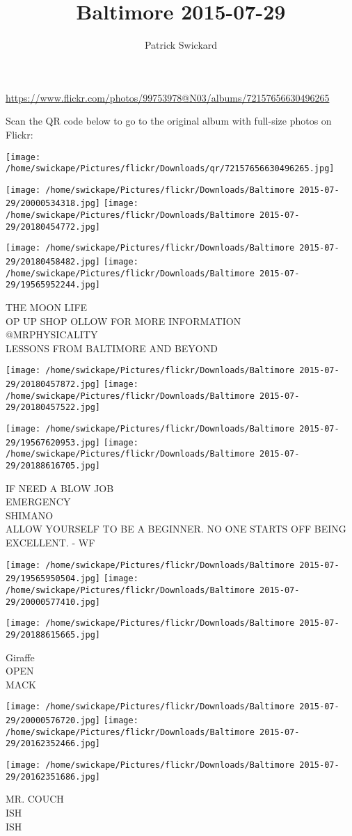 \documentclass[10pt,letterpaper]{article}
\title{Baltimore 2015-07-29}
\author{Patrick Swickard}
\date{}
\begin{document}
\maketitle

\url{https://www.flickr.com/photos/99753978@N03/albums/72157656630496265}

Scan the QR code below to go to the original album with full-size photos on Flickr:

\texttt{[image: /home/swickape/Pictures/flickr/Downloads/qr/72157656630496265.jpg]}
\pagebreak

\texttt{[image: /home/swickape/Pictures/flickr/Downloads/Baltimore 2015-07-29/20000534318.jpg]}
\texttt{[image: /home/swickape/Pictures/flickr/Downloads/Baltimore 2015-07-29/20180454772.jpg]}

\texttt{[image: /home/swickape/Pictures/flickr/Downloads/Baltimore 2015-07-29/20180458482.jpg]}
\texttt{[image: /home/swickape/Pictures/flickr/Downloads/Baltimore 2015-07-29/19565952244.jpg]}

THE MOON LIFE\\
OP UP SHOP OLLOW FOR MORE INFORMATION\\
@MRPHYSICALITY\\
LESSONS FROM BALTIMORE AND BEYOND
\pagebreak

\texttt{[image: /home/swickape/Pictures/flickr/Downloads/Baltimore 2015-07-29/20180457872.jpg]}
\texttt{[image: /home/swickape/Pictures/flickr/Downloads/Baltimore 2015-07-29/20180457522.jpg]}

\texttt{[image: /home/swickape/Pictures/flickr/Downloads/Baltimore 2015-07-29/19567620953.jpg]}
\texttt{[image: /home/swickape/Pictures/flickr/Downloads/Baltimore 2015-07-29/20188616705.jpg]}

IF NEED A BLOW JOB\\
EMERGENCY\\
SHIMANO\\
ALLOW YOURSELF TO BE A BEGINNER.  NO ONE STARTS OFF BEING EXCELLENT.  {-} WF
\pagebreak

\texttt{[image: /home/swickape/Pictures/flickr/Downloads/Baltimore 2015-07-29/19565950504.jpg]}
\texttt{[image: /home/swickape/Pictures/flickr/Downloads/Baltimore 2015-07-29/20000577410.jpg]}

\vspace{0.25in}
\texttt{[image: /home/swickape/Pictures/flickr/Downloads/Baltimore 2015-07-29/20188615665.jpg]}

Giraffe\\
OPEN\\
MACK
\pagebreak

\texttt{[image: /home/swickape/Pictures/flickr/Downloads/Baltimore 2015-07-29/20000576720.jpg]}
\texttt{[image: /home/swickape/Pictures/flickr/Downloads/Baltimore 2015-07-29/20162352466.jpg]}

\texttt{[image: /home/swickape/Pictures/flickr/Downloads/Baltimore 2015-07-29/20162351686.jpg]}

MR. COUCH\\
ISH\\
ISH
\pagebreak
\end{document}
